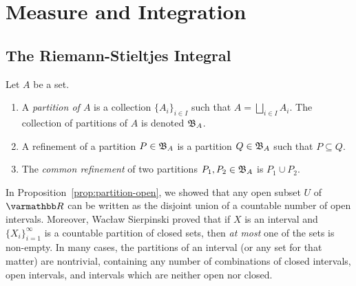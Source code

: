 \chapter{Measure and Integration}

\section{The Riemann-Stieltjes Integral}
\iffalse
    \begin{definition}
        Let $A$ be a set.
        \begin{enumerate}[label = (\arabic*),itemsep=1pt,topsep=3pt]
            \item A \textit{partition of $A$} is a collection $\{A_i\}_{i \in I}$ such that $A = \bigsqcup_{i \in I}A_i$. The collection of partitions of $A$ is denoted $\mathfrak{B}_A$.
            \item A refinement of a partition $P \in \mathfrak{B}_A$ is a partition $Q \in \mathfrak{B}_A$ such that $P \subseteq Q$.
            \item The \textit{common refinement} of two partitions $P_1,P_2 \in \mathfrak{B}_A$ is $P_1 \cup P_2$.
        \end{enumerate}
    \end{definition}

    \begin{example}
        In Proposition~\ref{prop:partition-open}, we showed that any open subset $U$ of $\bfR$ can be written as the disjoint union of a countable number of open intervals. Moreover, Wacław Sierpinski proved that if $X$ is an interval and $\{X_i\}_{i=1}^\infty$ is a countable partition of closed sets, then \textit{at most} one of the sets is non-empty. In many cases, the partitions of an interval (or any set for that matter) are nontrivial, containing any number of combinations of closed intervals, open intervals, and intervals which are neither open nor closed.
    \end{example}

